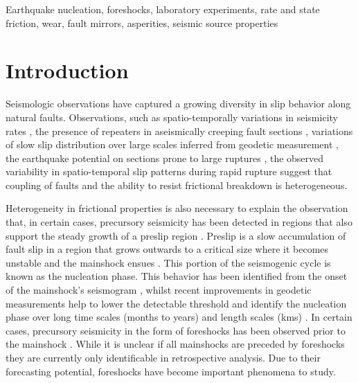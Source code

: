 \documentclass[preprint,1p, 10pt,authoryear]{elsarticle}
\begin{document}
\begin{frontmatter}
\begin{keyword}
Earthquake nucleation, foreshocks, laboratory experiments, rate and state friction, wear, fault mirrors, asperities, seismic source properties
\end{keyword}

\end{frontmatter}
\doublespacing
\linenumbers



\section{Introduction}
\label{int}
Seismologic observations have captured a growing diversity in slip behavior along natural faults. Observations, such as spatio-temporally variations in seismicity rates \citep{Tormann2014, Tormann2015, Gulia2016,Gulia2019}, the presence of repeaters in aseismically creeping fault sections \citep[e.g.][]{Nadeau1994, Nadeau1999, Shirzaei2013, Uchida2019}, variations of slow slip distribution over large scales inferred from geodetic measurement  \citep[e.g.][]{Brodsky2014, Ruiz2014, Socquet2017}, the earthquake potential on sections prone to large ruptures \citep{Buergmann2000,Buergmann2004}, the observed variability in spatio-temporal slip patterns during rapid rupture \citep[e.g.][]{Mai2002, Tinti2005, Dreger2007, Galvez2016, Mai2018} suggest that coupling of faults and the ability to resist frictional breakdown is heterogeneous. 

Heterogeneity in frictional properties is also necessary to explain the observation that, in certain cases, precursory seismicity has been detected in regions that also support the steady growth of a preslip region \citep{Kato2012, Kato2016, Obara2016, Ruiz2014, Bouchon2013,Buergmann2004}. Preslip is a slow accumulation of fault slip in a region that grows outwards to a critical size where it becomes unstable and the mainshock ensues \citep{Ohnaka1992,Ben-Zion2008}. This portion of the seismogenic cycle is known as the nucleation phase. This behavior has been identified from the onset of the mainshock's seismogram \citep{Iio1995, Ellsworth1995, Beroza1996}, whilst recent improvements in geodetic measurements help to lower the detectable threshold and identify the nucleation phase over long time scales (months to years) and length scales (kms) \citep[e.g.,][]{Roeloffs2006,Ruiz2014, Socquet2017}.  In certain cases, precursory seismicity in the form of foreshocks has been observed prior to the mainshock \citep[e.g.,][]{Dodge1995, Dodge1996, Bouchon2011}. While it is unclear if all mainshocks are preceded by foreshocks \citep{Brodsky2014, Mignan2014, Seif2018} they are currently only identificable in retrospective analysis. Due to their forecasting potential, foreshocks have become important phenomena to study.
\end{document}
